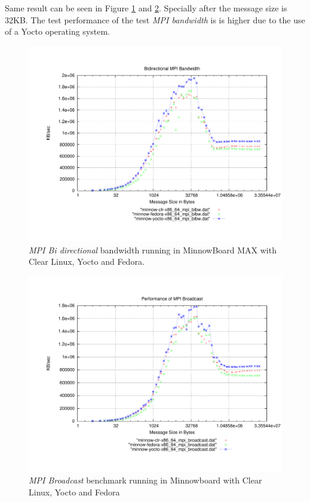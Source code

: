 Same result can be seen in Figure \ref{mpi_bibw_yocto} and
\ref{mpi_broadcast_yocto}. Specially after the
message size is 32KB. The test performance of the test \textit{MPI bandwidth}
is is higher due to the use of a Yocto operating system. 

\begin{figure}
  \includegraphics[width=\paperwidth]{images/mpbench_yocto_experiments/mpi_bibw.pdf}
\caption{\textit{MPI Bi directional} bandwidth running in MinnowBoard MAX with Clear Linux,
Yocto and Fedora.}
\label{mpi_bibw_yocto}
\end{figure}

\begin{figure}
  \includegraphics[width=\paperwidth]{images/mpbench_yocto_experiments/mpi_broadcast.pdf}
\caption{\textit{MPI Broadcast} benchmark running in Minnowboard with Clear Linux, Yocto and Fedora }
\label{mpi_broadcast_yocto}
\end{figure}


